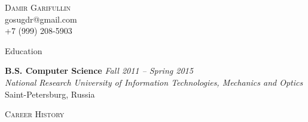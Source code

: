 \documentclass[12pt]{article}
\newenvironment{changemargin}[2]{%
  \begin{list}{}{%
    \setlength{\topsep}{0pt}%
    \setlength{\leftmargin}{#1}%
    \setlength{\rightmargin}{#2}%
    \setlength{\listparindent}{\parindent}%
    \setlength{\itemindent}{\parindent}%
    \setlength{\parsep}{\parskip}%
  }%
  \item[]}{\end{list}
}
\newcommand{\lineover}{
	\begin{changemargin}{-0.05in}{-0.05in}
		\vspace*{-8pt}
		\hrulefill \\
		\vspace*{-2pt}
	\end{changemargin}
}
\newcommand{\header}[1]{
	\begin{changemargin}{-0.5in}{-0.5in}
		\scshape{#1}\\
  	\lineover
	\end{changemargin}
}
\newcommand{\contact}[4]{
	\begin{changemargin}{-0.5in}{-0.5in}
		\begin{center}
			{\Large \scshape {#1}}\\ \smallskip
			{#2}\\ \smallskip 
			{#3}\\ \smallskip
			{#4}\smallskip
		\end{center}
	\end{changemargin}
}
\newenvironment{body} {
	\vspace*{-16pt}
	\begin{changemargin}{-0.25in}{-0.5in}
  }	
	{\end{changemargin}
}
\begin{document}
\contact{Damir Garifullin}{gosugdr@gmail.com}{+7 (999) 208-5903}

\header{Education}

\begin{body}
	\vspace{14pt}
	\textbf{B.S. Computer Science} \hfill \emph{Fall 2011 -- Spring 2015} \\
	\smallskip
	\emph{National Research University of Information Technologies, Mechanics and Optics} Saint-Petersburg, Russia\\
\end{body}

\smallskip


\header{Career History}
\end{document}
